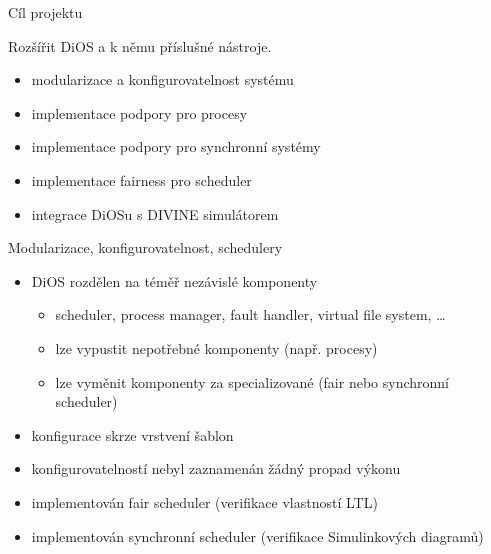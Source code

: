 \documentclass[large,ignorenonframetext,aspectratio=169,]{paradise-slide}
\providecommand{\tightlist}{%
  \setlength{\itemsep}{0pt}\setlength{\parskip}{0pt}}
\begin{document}
\begin{frame}{Cíl projektu}
\protect\hypertarget{cuxedl-projektu}{}

Rozšířit DiOS a k němu příslušné nástroje.

\begin{itemize}
\tightlist
\item
  modularizace a konfigurovatelnost systému
\item
  implementace podpory pro procesy
\item
  implementace podpory pro synchronní systémy
\item
  implementace fairness pro scheduler
\item
  integrace DiOSu s DIVINE simulátorem
\end{itemize}

\end{frame}

\begin{frame}{Modularizace, konfigurovatelnost, schedulery}
\protect\hypertarget{modularizace-konfigurovatelnost-schedulery}{}

\begin{itemize}
\tightlist
\item
  DiOS rozdělen na téměř nezávislé komponenty

  \begin{itemize}
  \tightlist
  \item
    scheduler, process manager, fault handler, virtual file system,
    \ldots{}
  \item
    lze vypustit nepotřebné komponenty (např. procesy)
  \item
    lze vyměnit komponenty za specializované (fair nebo synchronní
    scheduler)
  \end{itemize}
\item
  konfigurace skrze vrstvení šablon
\end{itemize}

\pause

\begin{itemize}
\tightlist
\item
  konfigurovatelností nebyl zaznamenán žádný propad výkonu
\end{itemize}

\pause

\begin{itemize}
\tightlist
\item
  implementován fair scheduler (verifikace vlastností LTL)
\item
  implementován synchronní scheduler (verifikace Simulinkových diagramů)
\end{itemize}

\end{frame}
\end{document}
